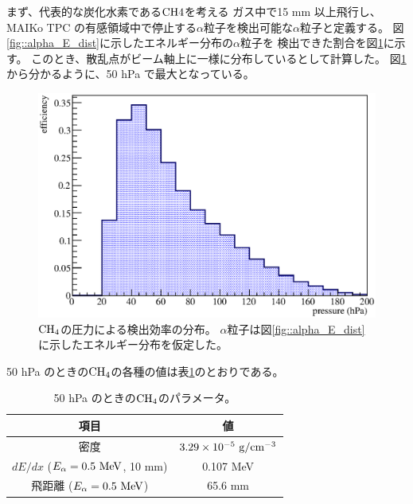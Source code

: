 まず、代表的な炭化水素である${\rm CH{4}}$を考える
ガス中で15 mm 以上飛行し、MAIKo TPC の有感領域中で停止する$\alpha$粒子を検出可能な$\alpha$粒子と定義する。
図\ref{fig::alpha_E_dist}に示したエネルギー分布の$\alpha$粒子を
検出できた割合を図\ref{fig::efficiency_P_dist}に示す。
このとき、散乱点がビーム軸上に一様に分布しているとして計算した。
図\ref{fig::efficiency_P_dist}から分かるように、50 hPa で最大となっている。
\begin{figure}
  \centering
  \includegraphics[clip, width=0.7\columnwidth]{eps/efficiency_P_dist.eps}
  \caption[${\rm CH_{4}}$の圧力による検出効率の分布。]
          {${\rm CH_{4}}$の圧力による検出効率の分布。
            $\alpha$粒子は図\ref{fig::alpha_E_dist}に示したエネルギー分布を仮定した。
           }
  \label{fig::efficiency_P_dist}
\end{figure}

50 hPa のときの${\rm CH_{4}}$の各種の値は表\ref{tab::CH4_50_params}のとおりである。
\begin{table}
  \centering
  \caption{50 hPa のときの${\rm CH_{4}}$のパラメータ。}
  \label{tab::CH4_50_params}
  \begin{tabular}{cc}
    \toprule
    項目 & 値\\
    \midrule
    密度 & $3.29\times10^{-5}~{\rm g/cm^{-3}}$\\
    $dE/dx$ ($E_{\alpha} = 0.5~{\rm MeV}$, 10 mm) & 0.107 MeV\\
    飛距離 ($E_{\alpha} = 0.5~{\rm MeV}$) & 65.6 mm\\
    \bottomrule
  \end{tabular}
\end{table}

